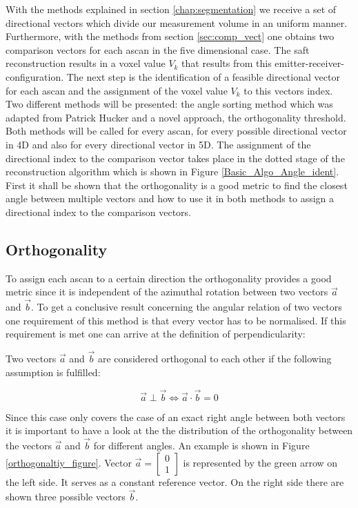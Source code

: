 With the methods explained in section \ref{chap:segmentation} we receive a set of directional vectors which divide our measurement volume in an uniform manner. 
Furthermore, with the methods from section \ref{sec:comp_vect} one obtains two comparison vectors for each \ac{ascan} in the five dimensional case. The \ac{saft} reconstruction results in a voxel value $V_k$ that results from this emitter-receiver-configuration. The next step is the identification of a feasible directional vector for each \ac{ascan} and the assignment of the voxel value $V_k$ to this vectors index. Two different methods will be presented: the angle sorting method which was adapted from Patrick Hucker \cite{PatrickHucker2014EvaluationRuckstreumodells} and a novel approach, the orthogonality threshold. Both methods will be called for every \ac{ascan}, for every possible directional vector in 4D and also for every directional vector in 5D. The assignment of the directional index to the comparison vector takes place in the dotted stage of the reconstruction algorithm which is shown in Figure \ref{Basic_Algo_Angle_ident}. First it shall be shown that the orthogonality is a good metric to find the closest angle between multiple vectors and how to use it in both methods to assign a directional index to the comparison vectors. 

\subsection{Orthogonality}
\label{sec:orthogonality}

To assign each \ac{ascan} to a certain direction the orthogonality provides a good metric since it is independent of the azimuthal rotation between two vectors $\overrightarrow{a}$ and $ \overrightarrow{b}$. 
To get a conclusive result concerning the angular relation of two vectors one requirement of this method is that every vector has to be normalised. If this requirement is met one can arrive at the definition of perpendicularity:

Two vectors $\overrightarrow{a}$ and $\overrightarrow{b}$ are considered orthogonal to each other if the following assumption is fulfilled:

\begin{equation}
\overrightarrow{a} \perp  \overrightarrow{b} \Leftrightarrow  \overrightarrow{a} \cdot  \overrightarrow{b} = 0
\label{equation_orthogonality}
\end{equation}

Since this case only covers the case of an exact right angle between both vectors it is important to have a look at the the distribution of the orthogonality between the vectors $\overrightarrow{a}$ and $\overrightarrow{b}$ for different angles. An example is shown in Figure \ref{orthogonaltiy_figure}. Vector $\overrightarrow{a} = \begin{bmatrix} 0 \\ 1 \end{bmatrix}$ is represented by the green arrow on the left side. It serves as a constant reference vector. On the right side there are shown three possible vectors $\overrightarrow{b}$.

